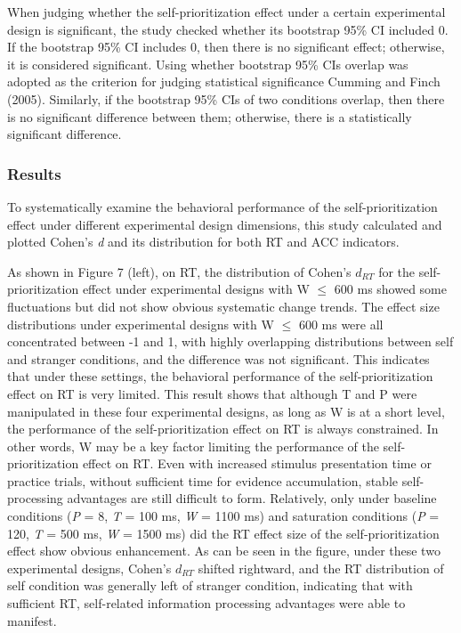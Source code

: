 \documentclass[
  english,
  man,floatsintext]{apa6}
\begin{document}
When judging whether the self-prioritization effect under a certain experimental design is significant, the study checked whether its bootstrap 95\% CI included 0. If the bootstrap 95\% CI includes 0, then there is no significant effect; otherwise, it is considered significant. Using whether bootstrap 95\% CIs overlap was adopted as the criterion for judging statistical significance Cumming and Finch (2005). Similarly, if the bootstrap 95\% CIs of two conditions overlap, then there is no significant difference between them; otherwise, there is a statistically significant difference.

\subsubsection{Results}\label{results-2}

To systematically examine the behavioral performance of the self-prioritization effect under different experimental design dimensions, this study calculated and plotted Cohen's \emph{d} and its distribution for both RT and ACC indicators.

As shown in Figure 7 (left), on RT, the distribution of Cohen's \(d_{RT}\) for the self-prioritization effect under experimental designs with W \(\leq\) 600 ms showed some fluctuations but did not show obvious systematic change trends. The effect size distributions under experimental designs with W \(\leq\) 600 ms were all concentrated between -1 and 1, with highly overlapping distributions between self and stranger conditions, and the difference was not significant. This indicates that under these settings, the behavioral performance of the self-prioritization effect on RT is very limited. This result shows that although T and P were manipulated in these four experimental designs, as long as W is at a short level, the performance of the self-prioritization effect on RT is always constrained. In other words, W may be a key factor limiting the performance of the self-prioritization effect on RT. Even with increased stimulus presentation time or practice trials, without sufficient time for evidence accumulation, stable self-processing advantages are still difficult to form. Relatively, only under baseline conditions (\emph{P} = 8, \emph{T} = 100 ms, \emph{W} = 1100 ms) and saturation conditions (\emph{P} = 120, \emph{T} = 500 ms, \emph{W} = 1500 ms) did the RT effect size of the self-prioritization effect show obvious enhancement. As can be seen in the figure, under these two experimental designs, Cohen's \(d_{RT}\) shifted rightward, and the RT distribution of self condition was generally left of stranger condition, indicating that with sufficient RT, self-related information processing advantages were able to manifest.
\end{document}
